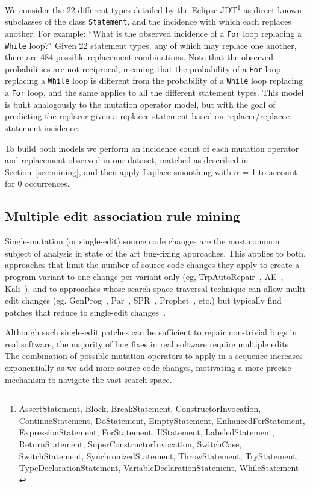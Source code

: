 \documentclass[conference]{IEEEtran}
\begin{document}
We consider 
the 22 different types detailed by the Eclipse
JDT\footnote{AssertStatement, Block, BreakStatement, ConstructorInvocation, ContinueStatement, DoStatement, EmptyStatement, EnhancedForStatement, ExpressionStatement, ForStatement, IfStatement, LabeledStatement, ReturnStatement, SuperConstructorInvocation, SwitchCase, SwitchStatement, SynchronizedStatement, ThrowStatement, TryStatement, TypeDeclarationStatement, VariableDeclarationStatement, WhileStatement \label{stmtNames}} as
direct known subclasses of the class \texttt{Statement}, and the incidence with which
each 
replaces another. For example: ``What is the observed incidence of a \texttt{For} loop 
replacing a \texttt{While} loop?" Given 22 statement types, any of which may replace one
another, there are 484 possible replacement combinations. 
Note that the observed probabilities are not reciprocal, meaning 
that the probability of a \texttt{For} loop replacing a \texttt{While} loop is different from the 
probability of a \texttt{While} loop replacing a \texttt{For} loop, and the same applies to all 
the different statement types.
This model is built analogously to the
mutation operator model, but with the goal of predicting the replacer given a replacee statement based on replacer/replacee statement incidence. 

To build both models we perform an incidence count of each mutation operator and replacement observed in our
dataset, matched as described in Section~\ref{sec:mining}, and then apply Laplace smoothing\cite{Russell10} with $\alpha$ = 1 to account for 0 occurrences.

\subsection{Multiple edit association rule mining} 
\label{multEdit}

Single-mutation (or single-edit) source code changes are the most 
common subject of analysis in 
state of the art bug-fixing
approaches. This applies to both, approaches that limit the number of source 
code changes they apply to create a program variant to one change per variant 
only (eg, TrpAutoRepair~\cite{Qi13TrpAutoR}, AE~\cite{Weimer13}, Kali~\cite{Qi15}), and 
to approaches whose search space traversal technique can allow multi-edit 
changes (eg. GenProg~\cite{legoues12}, Par~\cite{kim2013}, SPR~\cite{fan15SPR},
Prophet~\cite{long16proph}, etc.) but typically find patches that reduce to
single-edit changes~\cite{arcuri11}.

Although such single-edit patches can be
sufficient to repair non-trivial bugs in real software, the majority of bug fixes in real
software require multiple edits~\cite{zhong15,Soto16}. The combination of possible mutation
 operators to apply in a sequence increases exponentially as we add more source
 code changes, motivating a more precise mechanism to navigate the vast search
 space. 
\end{document}
